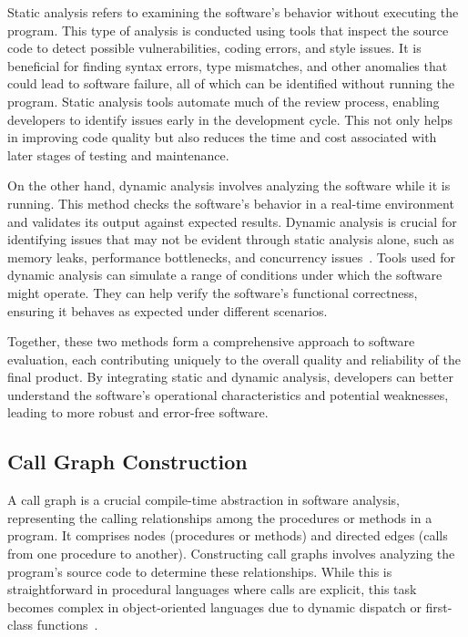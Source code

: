 Static analysis refers to examining the software's behavior without executing the program. This type of analysis is conducted using tools that inspect the source code to detect possible vulnerabilities, coding errors, and style issues. It is beneficial for finding syntax errors, type mismatches, and other anomalies that could lead to software failure, all of which can be identified without running the program. Static analysis tools automate much of the review process, enabling developers to identify issues early in the development cycle. This not only helps in improving code quality but also reduces the time and cost associated with later stages of testing and maintenance.

On the other hand, dynamic analysis involves analyzing the software while it is running. This method checks the software's behavior in a real-time environment and validates its output against expected results. Dynamic analysis is crucial for identifying issues that may not be evident through static analysis alone, such as memory leaks, performance bottlenecks, and concurrency issues~\cite{orton2022dynamic}. Tools used for dynamic analysis can simulate a range of conditions under which the software might operate. They can help verify the software's functional correctness, ensuring it behaves as expected under different scenarios.

Together, these two methods form a comprehensive approach to software evaluation, each contributing uniquely to the overall quality and reliability of the final product. By integrating static and dynamic analysis, developers can better understand the software’s operational characteristics and potential weaknesses, leading to more robust and error-free software.

\subsection{Call Graph Construction}
A call graph is a crucial compile-time abstraction in software analysis, representing the calling relationships among the procedures or methods in a program. It comprises nodes (procedures or methods) and directed edges (calls from one procedure to another). Constructing call graphs involves analyzing the program’s source code to determine these relationships. While this is straightforward in procedural languages where calls are explicit, this task becomes complex in object-oriented languages due to dynamic dispatch or first-class functions~\cite{grove1997call}.

